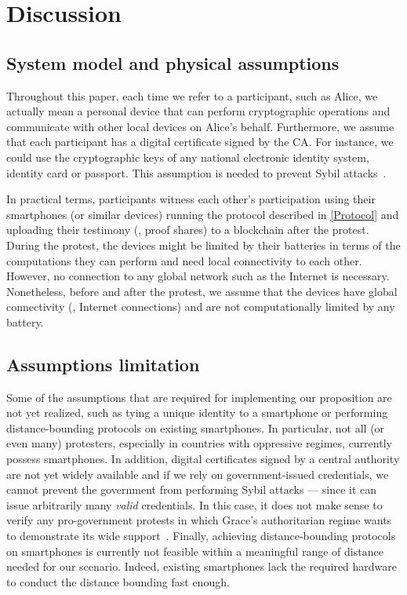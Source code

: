 \section{Discussion}%
\label{Discussion}

\subsection{System model and physical assumptions}
\label{assumptions}

Throughout this paper, each time we refer to a participant, such as Alice, we actually mean a personal device that can perform cryptographic operations and communicate with other local devices on Alice's behalf. 
Furthermore, we assume that each participant has a digital certificate signed by the \ac{CA}.
For instance, we could use the cryptographic keys of any national electronic identity system, identity card or passport.
This assumption is needed to prevent Sybil attacks~\cite{SybilAttack}.

In practical terms, participants witness each other's participation using their smartphones (or similar devices) running the protocol described in \cref{Protocol} and uploading their testimony (\ie, proof shares) to a blockchain after the protest. 
During the protest, the devices might be limited by their batteries in terms of the computations they can perform and need local connectivity to each other.
However, no connection to any global network such as the Internet is necessary. 
Nonetheless, before and after the protest, we assume that the devices have global connectivity (\ie, Internet connections) and are not computationally limited by any battery.



\subsection{Assumptions limitation} 

Some of the assumptions that are required for implementing our proposition are not yet realized, such as tying a unique identity to a smartphone or performing distance-bounding protocols on existing smartphones. 
In particular, not all (or even many) protesters, especially in countries with oppressive regimes, currently possess smartphones.
In addition, digital certificates signed by a central authority are not yet widely available and if we rely on government-issued credentials, we cannot prevent the government from performing Sybil attacks --- since it can issue arbitrarily many \emph{valid} credentials.
In this case, it does not make sense to verify any pro-government protests in which Grace's authoritarian regime wants to demonstrate its wide support~\cite{AlJazeeraOnVenezuela2017,VenezuelanStateWorkersCalledToParticipate}.
Finally, achieving distance-bounding protocols on smartphones is currently not feasible within a meaningful range of distance needed for our scenario.
Indeed, existing smartphones lack the required hardware to conduct the distance bounding fast enough.

